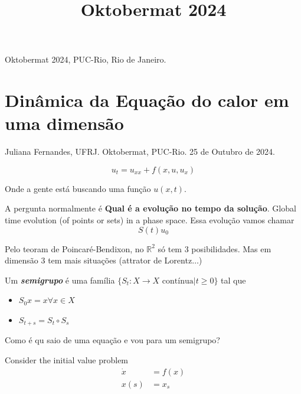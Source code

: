 



\title{Oktobermat 2024}
\maketitle

\label{section-phantom}

\tableofcontents



Oktobermat 2024, PUC-Rio, Rio de Janeiro.

\section{Dinâmica da Equação do calor em uma
dimensão}
\label{section-heat-equation-dynamics}

\noindent
Juliana Fernandes, UFRJ.
Oktobermat, PUC-Rio.
25 de Outubro de 2024.

\bigskip\noindent
\begin{equation}
\label{equation-heat-1}
u_{t}=u_{x x}+f(x,u,u_x)
\end{equation}

Onde a gente está buscando uma função
$u(x,t)$.

A pergunta normalmente  é {\bf Qual é a
evolução no tempo da solução}. Global time
evolution  (of points or sets) in a phase
space. Essa evolução vamos chamar
$$S(t)u_0$$

Pelo teoram de Poincaré-Bendixon, no
$\mathbb{R}^{2}$ só tem 3 posibilidades. Mas
em dimensão 3 tem mais situações (attrator de
Lorentz$\ldots$)

\medskip{}

\begin{definition}
\label{definition-heat-semigroup}
Um {\it\bf semigrupo} é uma família
$\{S_t:X\to X \text{ contínua} |t \geq 0\}$
tal que
\begin{itemize}
\item $S_0x=x \forall x \in X$
\item $S_{t+s}=S_t \circ  S_s$
\end{itemize}
\end{definition}

Como é qu saio de uma equação e vou para um
semigrupo?

Consider the initial value problem
$$
\begin{aligned}
\dot x &=f(x)\\
x(s)&=x_s
\end{aligned}
$$

